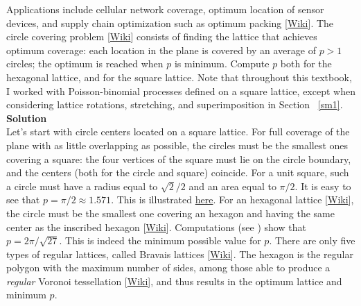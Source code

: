 \documentclass[10pt]{article}
\begin{document}
\begin{Exercise}
Applications include cellular network coverage, optimum location of sensor devices, and supply chain optimization such as optimum packing [\href{https://en.wikipedia.org/wiki/Circle_packing}{Wiki}]. The \textcolor{index}{circle covering problem}
[\href{https://en.wikipedia.org/wiki/Overlapping_circles_grid}{Wiki}] consists of finding the lattice that achieves optimum coverage: each location
in the plane is covered by an average of $p>1$ circles; the optimum is reached when $p$ is minimum.  Compute $p$ both for the hexagonal lattice, and for the square lattice. Note that throughout this textbook, I worked with Poisson-binomial processes defined on a square lattice, except when considering lattice rotations, stretching, and superimposition in Section ~\ref{sm1}. \vspace{1ex} \\
{\bf Solution}  \vspace{1ex} \\
Let's start with circle centers located on a square lattice. For full coverage of the plane with as little overlapping as possible, the circles must be the smallest ones covering a square: the four vertices of the square must lie on the circle boundary, and the centers (both for the circle and square) coincide. For a unit square, such a circle must have a radius equal to $\sqrt{2}/2$ and an area equal to  $\pi/2$.
It is easy to see that $p=\pi/2\approx 1.571$.
This is illustrated  \href{https://en.wikipedia.org/wiki/Overlapping_circles_grid}{here}. For an
\textcolor{index}{hexagonal lattice} [\href{https://en.wikipedia.org/wiki/Hexagonal}{Wiki}], the circle must be the smallest one covering an hexagon and having the same center as the inscribed hexagon [\href{https://en.wikipedia.org/wiki/Hexagon}{Wiki}]. Computations (see \cite{circle34}) show that $p= 2\pi/\sqrt{27}$. This is indeed the minimum possible value for $p$. There are only five types of regular lattices, called \textcolor{index}{Bravais lattices} [\href{https://en.wikipedia.org/wiki/Bravais_lattice}{Wiki}].
The hexagon is the regular polygon with the maximum number of sides, among those able to produce a {\em regular} \textcolor{index}{Voronoi tessellation}
 [\href{https://en.wikipedia.org/wiki/Voronoi_diagram}{Wiki}], and thus results in the optimum lattice and minimum $p$.
\end{Exercise}
\end{document}
